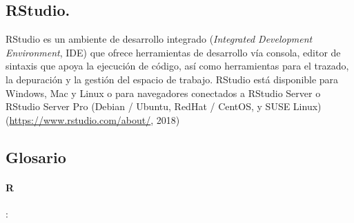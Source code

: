\subsection{RStudio.}

RStudio es un ambiente de desarrollo integrado (\textit{Integrated Development Environment}, IDE) que ofrece herramientas de desarrollo vía consola, editor de sintaxis que apoya la ejecución de código, así como herramientas para el trazado, la depuración y la gestión del espacio de trabajo.  RStudio está disponible para Windows, Mac y Linux o para navegadores conectados a RStudio Server o RStudio Server Pro (Debian / Ubuntu, RedHat / CentOS, y SUSE Linux) (\url{https://www.rstudio.com/about/}, 2018)
 

\subsection{Glosario}

\paragraph{R}: 


